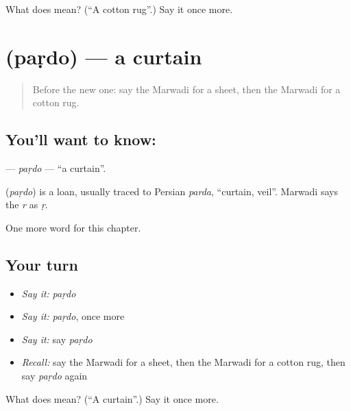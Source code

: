 \begin{tcolorbox}[breakable,colback=teal!4,colframe=teal!35!black,title={Before you move on}]
What does  mean? (\textquotedblleft{}A cotton rug\textquotedblright{}.) Say it once more.
\end{tcolorbox}
\section[\texorpdfstring{\mw{पड़दो} (paṛdo)}{पड़दो (paṛdo)}]{ (paṛdo) — a curtain}

\label{lesson:MW-C123-pardo}



\begin{quote}
Before the new one: say the Marwadi for a sheet, then the Marwadi for a cotton rug.
\end{quote}

\subsection*{You'll want to know: }
\textbf{} — \emph{paṛdo} — \textquotedblleft{}a curtain\textquotedblright{}.

\begin{cousinweb}
\textbf{} (\emph{paṛdo}) is a loan, usually traced to Persian \emph{parda}, \textquotedblleft{}curtain, veil\textquotedblright{}. Marwadi says the \emph{r} as \emph{ṛ}.
\end{cousinweb}

\begin{grammarlens}[title={What you've built}]
One more word for this chapter.
\end{grammarlens}

\subsection*{Your turn}
\begin{itemize}
\raggedright
  \item \emph{Say it:} \emph{paṛdo}
  \item \emph{Say it:} \emph{paṛdo}, once more
  \item \emph{Say it:} say \emph{paṛdo}
  \item \emph{Recall:} say the Marwadi for a sheet, then the Marwadi for a cotton rug, then say \emph{paṛdo} again
\end{itemize}

\begin{tcolorbox}[breakable,colback=teal!4,colframe=teal!35!black,title={Before you move on}]
What does  mean? (\textquotedblleft{}A curtain\textquotedblright{}.) Say it once more.
\end{tcolorbox}
